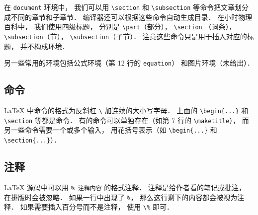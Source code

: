 在 \lstinline|document| 环境中， 我们可以用 \lstinline|\section| 和 \lstinline|\subsection| 等命令把文章划分成不同的章节和子章节． 编译器还可以根据这些命令自动生成目录． 在小时物理百科中， 我们使用四级标题， 分别是 \lstinline|\part|（部分）， \lstinline|\section| （词条）， \lstinline|\subsection|（节）， \lstinline|\subsection|（子节）． 注意这些命令只是用于插入对应的标题， 并不构成环境．

另一些常用的环境包括公式环境（第 12 行的 \lstinline|equation|） 和图片环境（未给出）．

\subsection{命令}
LaTeX 中命令的格式为反斜杠 \lstinline|\| 加连续的大小写字母． 上面的 \lstinline|\begin{...}| 和 \lstinline|\section| 等都是命令． 有的命令可以单独存在（如第 7 行的 \lstinline|\maketitle|）， 而另一些命令需要一个或多个输入， 用花括号表示（如 \lstinline|\begin{...}| 和 \lstinline|\section{...}|）．

\subsection{注释}
LaTeX 源码中可以用 \lstinline|% 注释内容| 的格式注释． 注释是给作者看的笔记或批注， 在排版时会被忽略． 如果一行中出现了 \lstinline|%|， 那么这行剩下的内容都会被视为注释． 如果需要插入百分号而不是注释， 使用 \lstinline|\%| 即可．

